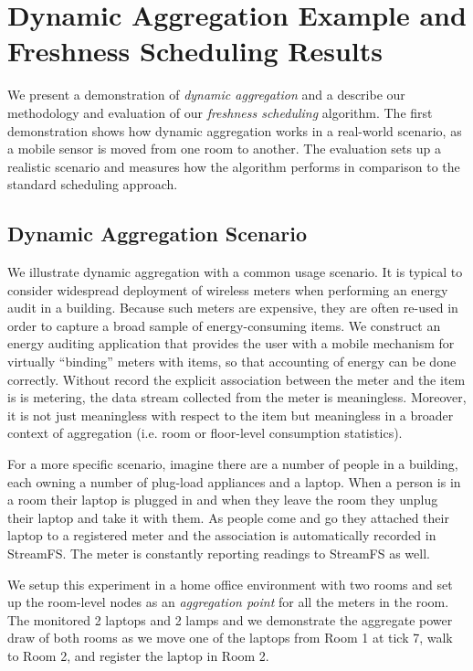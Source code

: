 \section{Dynamic Aggregation Example and Freshness Scheduling Results}


We present a demonstration of \emph{dynamic aggregation} and a describe our methodology and evaluation of
our \emph{freshness scheduling} algorithm.  The first demonstration shows how dynamic aggregation works in a real-world
scenario, as a mobile sensor is moved from one room to another.  The evaluation sets up a realistic scenario and
measures how the algorithm performs in comparison to the standard scheduling approach.

\subsection{Dynamic Aggregation Scenario}
We illustrate dynamic aggregation with a common usage scenario.  It is typical to consider widespread deployment 
of wireless meters when performing an energy audit in a building.  Because such meters are expensive, they are often 
re-used in order to capture a broad sample of energy-consuming items.  We construct an energy auditing application
that provides the user with a mobile mechanism for virtually ``binding'' meters with items, so that accounting of
energy can be done correctly.  Without record the explicit association between the meter and the item is is metering, 
the data stream collected from the meter is meaningless.  Moreover, it is not just meaningless with respect to the item
but meaningless in a broader context of aggregation (i.e. room or floor-level consumption statistics).

For a more specific scenario, imagine there are a number of people in a building,
each owning a number of plug-load appliances and a laptop.  When a person is in a room their laptop
is plugged in and when they leave the room they unplug their laptop and take it with them.  As people come and go
they attached their laptop to a registered meter and the association is automatically recorded in StreamFS.
The meter is constantly reporting readings to StreamFS as well.  

We setup this experiment in a home office environment with two rooms
and set up the room-level nodes as an \emph{aggregation point} for all the meters in the room.  The monitored
2 laptops and 2 lamps and we demonstrate the aggregate power draw of both rooms as we move one of the laptops from
Room 1 at tick 7, walk to Room 2, and register the laptop in Room 2.

